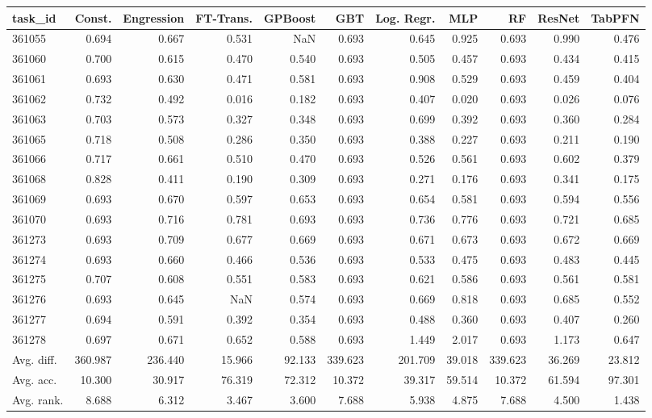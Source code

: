 \begin{tabular}{lrrrrrrrrrr}
\toprule
task\_id & Const. & Engression & FT-Trans. & GPBoost & GBT & Log. Regr. & MLP & RF & ResNet & TabPFN \\
\midrule
361055 & 0.694 & 0.667 & 0.531 & NaN & 0.693 & 0.645 & 0.925 & 0.693 & 0.990 & 0.476 \\
361060 & 0.700 & 0.615 & 0.470 & 0.540 & 0.693 & 0.505 & 0.457 & 0.693 & 0.434 & 0.415 \\
361061 & 0.693 & 0.630 & 0.471 & 0.581 & 0.693 & 0.908 & 0.529 & 0.693 & 0.459 & 0.404 \\
361062 & 0.732 & 0.492 & 0.016 & 0.182 & 0.693 & 0.407 & 0.020 & 0.693 & 0.026 & 0.076 \\
361063 & 0.703 & 0.573 & 0.327 & 0.348 & 0.693 & 0.699 & 0.392 & 0.693 & 0.360 & 0.284 \\
361065 & 0.718 & 0.508 & 0.286 & 0.350 & 0.693 & 0.388 & 0.227 & 0.693 & 0.211 & 0.190 \\
361066 & 0.717 & 0.661 & 0.510 & 0.470 & 0.693 & 0.526 & 0.561 & 0.693 & 0.602 & 0.379 \\
361068 & 0.828 & 0.411 & 0.190 & 0.309 & 0.693 & 0.271 & 0.176 & 0.693 & 0.341 & 0.175 \\
361069 & 0.693 & 0.670 & 0.597 & 0.653 & 0.693 & 0.654 & 0.581 & 0.693 & 0.594 & 0.556 \\
361070 & 0.693 & 0.716 & 0.781 & 0.693 & 0.693 & 0.736 & 0.776 & 0.693 & 0.721 & 0.685 \\
361273 & 0.693 & 0.709 & 0.677 & 0.669 & 0.693 & 0.671 & 0.673 & 0.693 & 0.672 & 0.669 \\
361274 & 0.693 & 0.660 & 0.466 & 0.536 & 0.693 & 0.533 & 0.475 & 0.693 & 0.483 & 0.445 \\
361275 & 0.707 & 0.608 & 0.551 & 0.583 & 0.693 & 0.621 & 0.586 & 0.693 & 0.561 & 0.581 \\
361276 & 0.693 & 0.645 & NaN & 0.574 & 0.693 & 0.669 & 0.818 & 0.693 & 0.685 & 0.552 \\
361277 & 0.694 & 0.591 & 0.392 & 0.354 & 0.693 & 0.488 & 0.360 & 0.693 & 0.407 & 0.260 \\
361278 & 0.697 & 0.671 & 0.652 & 0.588 & 0.693 & 1.449 & 2.017 & 0.693 & 1.173 & 0.647 \\
Avg. diff. & 360.987 & 236.440 & 15.966 & 92.133 & 339.623 & 201.709 & 39.018 & 339.623 & 36.269 & 23.812 \\
Avg. acc. & 10.300 & 30.917 & 76.319 & 72.312 & 10.372 & 39.317 & 59.514 & 10.372 & 61.594 & 97.301 \\
Avg. rank. & 8.688 & 6.312 & 3.467 & 3.600 & 7.688 & 5.938 & 4.875 & 7.688 & 4.500 & 1.438 \\
\bottomrule
\end{tabular}
